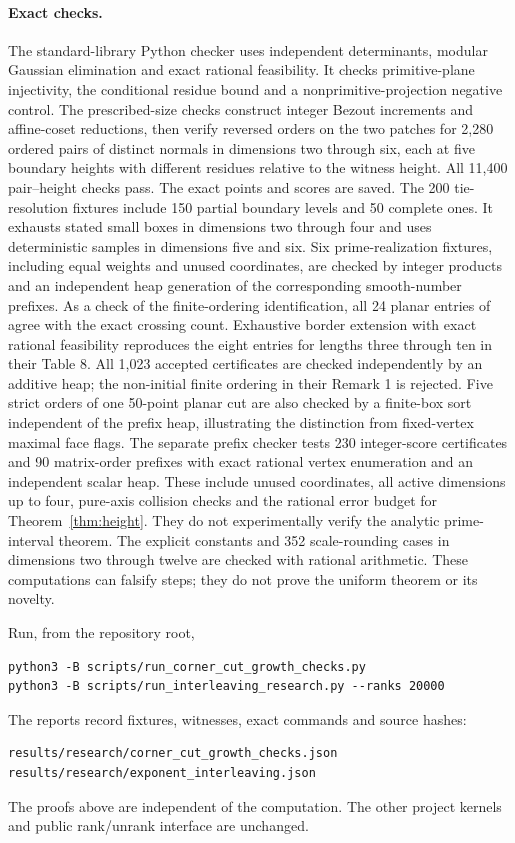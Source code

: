 \documentclass[11pt,a4paper]{article}
\theoremstyle{remark}
\begin{document}
\paragraph{Exact checks.}
The standard-library Python checker
uses independent determinants, modular Gaussian elimination and exact
rational feasibility. It checks primitive-plane injectivity, the
conditional residue bound and a nonprimitive-projection negative control.
The prescribed-size checks construct integer Bezout
increments and affine-coset reductions, then verify reversed orders on
the two patches for 2,280 ordered pairs of distinct normals in dimensions
two through six, each at five boundary heights with different residues
relative to the witness height. All 11,400 pair--height checks pass.
The exact points and scores are saved. The 200 tie-resolution fixtures
include 150 partial boundary levels and 50 complete ones.
It exhausts stated small boxes in dimensions two through four and uses
deterministic samples in dimensions five and six.
Six prime-realization fixtures, including equal weights and unused
coordinates, are checked by integer products and an independent
heap generation of the corresponding smooth-number prefixes.
As a check of the finite-ordering identification, all 24 planar entries
of \cite[Table 7]{VP} agree with the exact crossing count. Exhaustive
border extension with exact rational feasibility reproduces the eight
entries for lengths three through ten in their Table 8. All 1,023
accepted certificates are checked independently by an additive heap;
the non-initial finite ordering in their Remark 1 is rejected.
Five strict orders of one 50-point planar cut are also checked by a
finite-box sort independent of the prefix heap, illustrating the
distinction from fixed-vertex maximal face flags.
The separate prefix checker tests 230 integer-score certificates and
90 matrix-order prefixes with exact rational vertex enumeration and an
independent scalar heap. These include unused coordinates, all active
dimensions up to four, pure-axis collision checks and the rational
error budget for Theorem~\ref{thm:height}. They do not experimentally
verify the analytic prime-interval theorem.
The explicit constants and 352 scale-rounding cases in dimensions
two through twelve are checked with rational arithmetic.
These computations can falsify steps; they do not prove the uniform
theorem or its novelty.

Run, from the repository root,
\begin{verbatim}
python3 -B scripts/run_corner_cut_growth_checks.py
python3 -B scripts/run_interleaving_research.py --ranks 20000
\end{verbatim}
The reports record fixtures, witnesses, exact commands and source hashes:
\begin{verbatim}
results/research/corner_cut_growth_checks.json
results/research/exponent_interleaving.json
\end{verbatim}
The proofs above are independent of the computation.
The other project kernels and public rank/unrank interface are unchanged.
\end{document}

